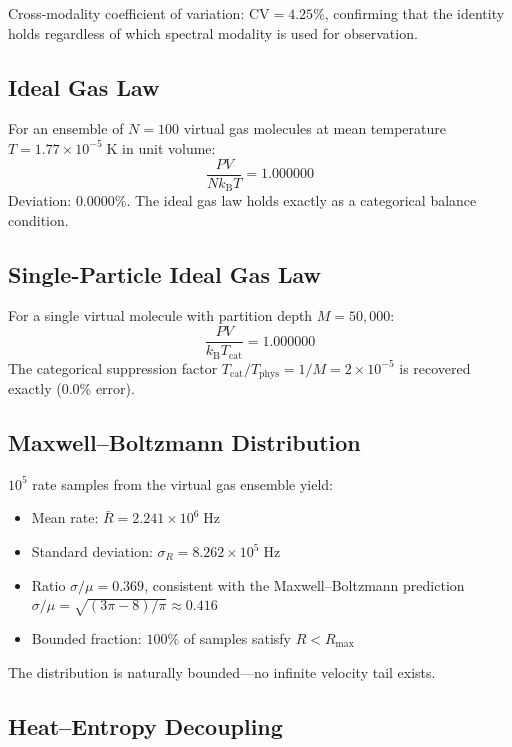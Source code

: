\documentclass[twocolumn,10pt,a4paper]{article}
\theoremstyle{plain}
\theoremstyle{definition}
\theoremstyle{remark}
\newcommand{\kB}{k_{\mathrm{B}}}
\begin{document}
Cross-modality coefficient of variation: $\mathrm{CV} = 4.25\%$, confirming that the identity holds regardless of which spectral modality is used for observation.

\subsection{Ideal Gas Law}

For an ensemble of $N = 100$ virtual gas molecules at mean temperature $T = 1.77 \times 10^{-5}\;\mathrm{K}$ in unit volume:
\begin{equation}
    \frac{PV}{N\kB T} = 1.000000
\end{equation}
Deviation: $0.0000\%$. The ideal gas law holds exactly as a categorical balance condition.

\subsection{Single-Particle Ideal Gas Law}

For a single virtual molecule with partition depth $M = 50{,}000$:
\begin{equation}
    \frac{PV}{\kB T_{\mathrm{cat}}} = 1.000000
\end{equation}
The categorical suppression factor $T_{\mathrm{cat}}/T_{\mathrm{phys}} = 1/M = 2 \times 10^{-5}$ is recovered exactly (0.0\% error).

\subsection{Maxwell--Boltzmann Distribution}

$10^5$ rate samples from the virtual gas ensemble yield:
\begin{itemize}
    \item Mean rate: $\bar{R} = 2.241 \times 10^6\;\mathrm{Hz}$
    \item Standard deviation: $\sigma_R = 8.262 \times 10^5\;\mathrm{Hz}$
    \item Ratio $\sigma/\mu = 0.369$, consistent with the Maxwell--Boltzmann prediction $\sigma/\mu = \sqrt{(3\pi - 8)/\pi} \approx 0.416$
    \item Bounded fraction: $100\%$ of samples satisfy $R < R_{\max}$
\end{itemize}

The distribution is naturally bounded---no infinite velocity tail exists.

\subsection{Heat--Entropy Decoupling}
\end{document}
